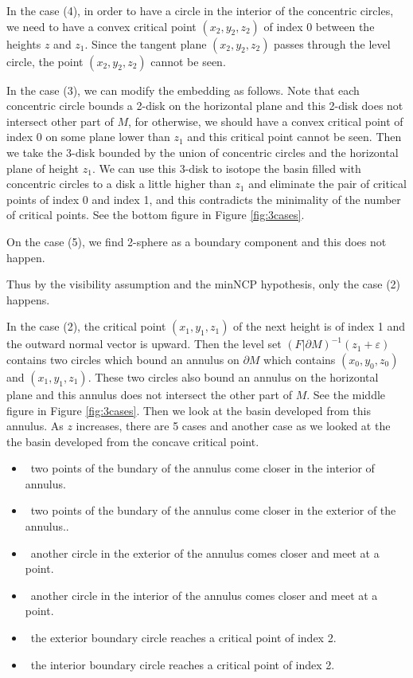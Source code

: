 \documentclass{amsart}
\numberwithin{equation}{section}
\newcommand{\bd}{\partial}
\begin{document}
In the case (4), in order to have a circle in the interior of the concentric circles, we need to have a convex critical point $(x_2,y_2,z_2)$ of index 0 between the heights $z$ and $z_1$. Since the tangent plane $(x_2,y_2,z_2)$ passes through the level circle, the point $(x_2,y_2,z_2)$ cannot be seen.

In the case (3), we can modify the embedding as follows. Note that 
each concentric circle bounds a 2-disk on the horizontal plane and this 2-disk does not intersect other part of $M$, for otherwise, we should have a 
convex critical point of index 0 on some plane lower than $z_1$ and this critical point cannot be seen. Then we take the 3-disk bounded by the union of concentric circles and the horizontal plane of height $z_1$. We can use this 3-disk to isotope the basin filled with concentric circles to a disk a little higher than $z_1$ and  eliminate the pair of critical points of index $0$ and index 1, and this contradicts the minimality of the number of critical points. See the bottom figure in Figure \ref{fig:3cases}.

On the case (5), we find 2-sphere as a boundary component and this does not happen.

Thus by the visibility assumption and the minNCP hypothesis, only the case (2) happens. 

In the case (2), the critical point $(x_1,y_1,z_1)$ of the next height is of index 1 and the outward normal vector is upward. Then the level set $(F|\bd M)^{-1}(z_1+\varepsilon)$ contains two circles which bound an annulus on $\bd M$ which contains $(x_0,y_0,z_0)$ and $(x_1,y_1,z_1)$. These two circles also bound an annulus on the horizontal plane and this annulus does not intersect the other part of $M$. See the middle figure in Figure \ref{fig:3cases}. Then we look at the basin developed from this annulus. As $z$ increases, there are 5 cases and another case 
as we looked at the the basin developed from the concave critical point.
\begin{itemize}
\item[(1)]\ 
 two points of the bundary of the annulus come closer in the interior of annulus.
\item[(2)]\ 
 two points of the bundary of the annulus come closer in the exterior of the annulus..
\item[(3)]\ 
 another circle in the exterior of the annulus comes closer and meet at a point.
\item[(4)]\ 
 another circle in the interior of the annulus comes closer and meet at a point.
\item[(5)]\ 
the exterior boundary circle reaches a critical point of index 2. 

\item[(6)]\ 
the interior boundary circle reaches a critical point of index 2. 
\end{itemize}
\end{document}
